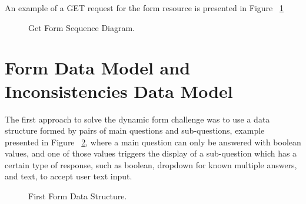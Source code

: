 An example of a GET request for the form resource is presented in Figure ~\ref{fig:getForm_Sequence_Diagram}

\begin{figure}[H]
	\begin{center}
	\end{center}
	\caption{Get Form Sequence Diagram.}\label{fig:getForm_Sequence_Diagram}
\end{figure}


\section{Form Data Model and Inconsistencies Data Model}

The first approach to solve the dynamic form challenge was to use a data structure formed by pairs of main questions and sub-questions, example presented in Figure ~\ref{fig:old_form}, where a main question can only be answered with boolean values, and one of those values triggers the display of a sub-question which has a certain type of response, such as boolean, dropdown for known multiple answers, and text, to accept user text input.

\begin{figure}[hbt!]
	\begin{center}
	\end{center}
	\caption{First Form Data Structure.}\label{fig:old_form}
\end{figure}

